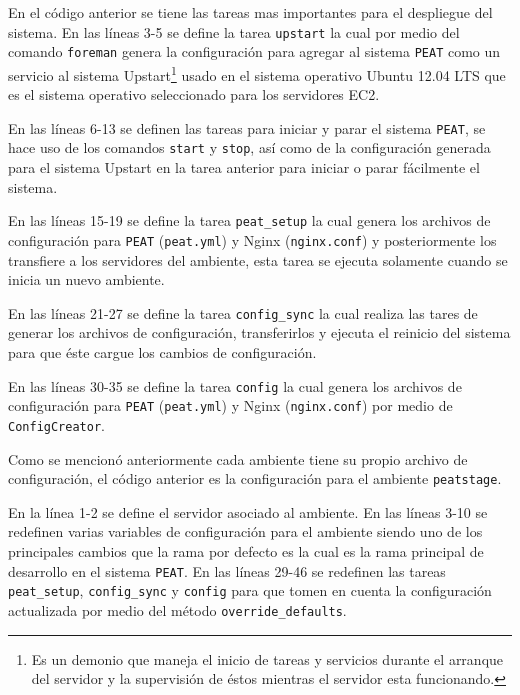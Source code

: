 En el código anterior se tiene las tareas mas importantes para el
despliegue del sistema. En las líneas 3-5 se define la tarea \texttt{upstart}
la cual por medio del comando \texttt{foreman} genera la configuración para agregar
al sistema \texttt{PEAT} como un servicio al sistema Upstart\footnote{Es un demonio
  que maneja el inicio de tareas y servicios durante el arranque del servidor y la
  supervisión de éstos mientras el servidor esta funcionando.} usado en el sistema
operativo Ubuntu 12.04 LTS que es el sistema operativo seleccionado para los
servidores EC2.

En las líneas 6-13 se definen las tareas para iniciar y parar el sistema
\texttt{PEAT}, se hace uso de los comandos \texttt{start} y \texttt{stop}, así como
de la configuración generada para el sistema Upstart en la tarea anterior para
iniciar o parar fácilmente el sistema.

En las líneas 15-19 se define la tarea \texttt{peat\_setup} la cual genera
los archivos de configuración para \texttt{PEAT} (\texttt{peat.yml}) y
Nginx (\texttt{nginx.conf}) y posteriormente los transfiere a los servidores
del ambiente, esta tarea se ejecuta solamente cuando se inicia un nuevo
ambiente.

En las líneas 21-27 se define la tarea \texttt{config\_sync} la cual
realiza las tares de generar los archivos de configuración, transferirlos y
ejecuta el reinicio del sistema para que éste cargue los cambios de configuración.

En las líneas 30-35 se define la tarea \texttt{config} la cual genera
los archivos de configuración para \texttt{PEAT} (\texttt{peat.yml}) y
Nginx (\texttt{nginx.conf}) por medio de \texttt{ConfigCreator}.



Como se mencionó anteriormente cada ambiente tiene su propio archivo de
configuración, el código anterior es la configuración para el ambiente
\texttt{peatstage}.

En la línea 1-2 se define el servidor asociado al ambiente. En las líneas
3-10 se redefinen varias variables de configuración para el ambiente siendo uno
de los principales cambios que la rama por defecto es  la
cual es la rama principal de desarrollo en el sistema \texttt{PEAT}.
En las líneas 29-46 se redefinen las tareas \texttt{peat\_setup},
\texttt{config\_sync} y \texttt{config} para que tomen en cuenta la configuración
actualizada por medio del método \texttt{override\_defaults}.

